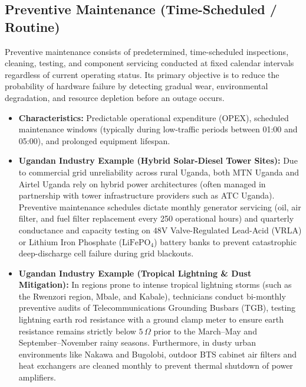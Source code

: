 \documentclass[12pt,a4paper]{report}
\begin{document}
\subsection{Preventive Maintenance (Time-Scheduled / Routine)}
Preventive maintenance consists of predetermined, time-scheduled inspections, cleaning, testing, and component servicing conducted at fixed calendar intervals regardless of current operating status. Its primary objective is to reduce the probability of hardware failure by detecting gradual wear, environmental degradation, and resource depletion before an outage occurs.
\begin{itemize}
    \item \textbf{Characteristics:} Predictable operational expenditure (OPEX), scheduled maintenance windows (typically during low-traffic periods between 01:00 and 05:00), and prolonged equipment lifespan.
    \item \textbf{Ugandan Industry Example (Hybrid Solar-Diesel Tower Sites):} Due to commercial grid unreliability across rural Uganda, both MTN Uganda and Airtel Uganda rely on hybrid power architectures (often managed in partnership with tower infrastructure providers such as ATC Uganda). Preventive maintenance schedules dictate monthly generator servicing (oil, air filter, and fuel filter replacement every 250 operational hours) and quarterly conductance and capacity testing on $48\text{V}$ Valve-Regulated Lead-Acid (VRLA) or Lithium Iron Phosphate ($\text{LiFePO}_4$) battery banks to prevent catastrophic deep-discharge cell failure during grid blackouts.
    \item \textbf{Ugandan Industry Example (Tropical Lightning \& Dust Mitigation):} In regions prone to intense tropical lightning storms (such as the Rwenzori region, Mbale, and Kabale), technicians conduct bi-monthly preventive audits of Telecommunications Grounding Busbars (TGB), testing lightning earth rod resistance with a ground clamp meter to ensure earth resistance remains strictly below $5\,\Omega$ prior to the March--May and September--November rainy seasons. Furthermore, in dusty urban environments like Nakawa and Bugolobi, outdoor BTS cabinet air filters and heat exchangers are cleaned monthly to prevent thermal shutdown of power amplifiers.
\end{itemize}
\end{document}
